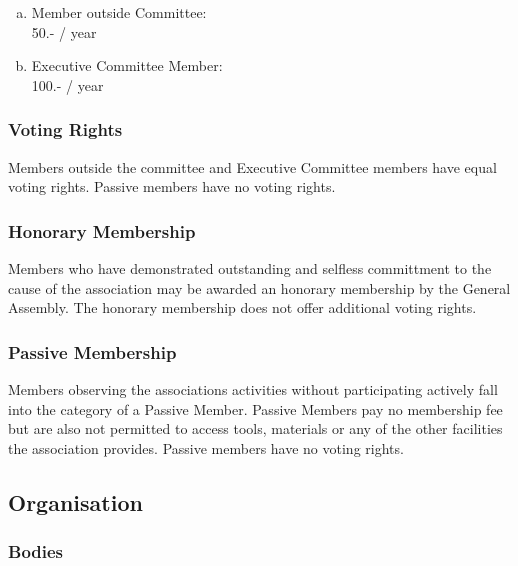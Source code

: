 \documentclass[12pt,a4paper,oneside]{article}
\newcounter{art}
\newcommand{\english}{    \switchcolumn[0]\noindent}
\begin{document}
\begin{paracol}{2}
	\begin{enumerate}[(a)]
	\item Member outside Committee: \\ 50.- / year
	\item Executive Committee Member: \\ 100.- / year

	\end{enumerate}



\english
	\subsubsection{Voting Rights}
	 Members outside the committee and Executive Committee members have equal voting rights. Passive members have no voting rights.
	 	\vspace{0.5cm}

\english
	\subsubsection{Honorary Membership}
	Members who have demonstrated outstanding and selfless committment to the cause of the association may be awarded an honorary membership by the General Assembly. The honorary membership does not offer additional voting rights.


\english
	\subsubsection{Passive Membership}
	Members observing the associations activities without participating actively fall into the category of a Passive Member. Passive Members pay no membership fee but are also not permitted to access tools, materials or any of the other facilities the association provides. Passive members have no voting rights.
	\vspace{0.6cm}





\english
	\subsection{Organisation}

\english
	\subsubsection{Bodies}


\end{paracol}
\end{document}
